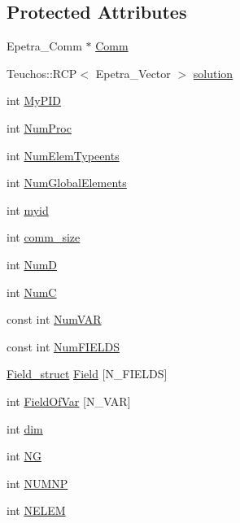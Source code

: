 \subsection*{Protected Attributes}
\begin{DoxyCompactItemize}
\item 
Epetra\+\_\+\+Comm $\ast$ \hyperlink{classGeProb_a28a1d41fc8c294fe629b95901df8f4e3}{Comm}
\item 
Teuchos\+::\+R\+CP$<$ Epetra\+\_\+\+Vector $>$ \hyperlink{classGeProb_af084ddda2d2d48a332141881d7b22a7d}{solution}
\item 
int \hyperlink{classGeProb_a646b814acd21db4a20bbbd9fe159da3f}{My\+P\+ID}
\item 
int \hyperlink{classGeProb_a8678d8a8dc17175ba98761beeccc0e04}{Num\+Proc}
\item 
int \hyperlink{classGeProb_a1555edf9114f6b65ef9a7820dfc16e63}{Num\+Elem\+Typeents}
\item 
int \hyperlink{classGeProb_af87232ea7d32eff7618f97a9792b3761}{Num\+Global\+Elements}
\item 
int \hyperlink{classGeProb_a45014741c0457991fb88b1dc1d2d31bc}{myid}
\item 
int \hyperlink{classGeProb_ab5aa970c9864597a442bfc8519352730}{comm\+\_\+size}
\item 
int \hyperlink{classGeProb_a1b63e3bc1b1f5e6582a87b044bbd4ccd}{NumD}
\item 
int \hyperlink{classGeProb_a579ca91b970ea46b1418310eaf5d8b31}{NumC}
\item 
const int \hyperlink{classGeProb_ac6d9c06150838e892ed3eaa1b60bac5d}{Num\+V\+AR}
\item 
const int \hyperlink{classGeProb_adede55ee31a140d1cd8a9076ecdc41e1}{Num\+F\+I\+E\+L\+DS}
\item 
\hyperlink{structField__struct}{Field\+\_\+struct} \hyperlink{classGeProb_aaaeb3e022301e2df5e180af7900a352e}{Field} \mbox{[}N\+\_\+\+F\+I\+E\+L\+DS\mbox{]}
\item 
int \hyperlink{classGeProb_a520a47a06c38cfe59938d2bbd65773a2}{Field\+Of\+Var} \mbox{[}N\+\_\+\+V\+AR\mbox{]}
\item 
int \hyperlink{classGeProb_a122f6dbb7e9a60a35f257ae369a57f77}{dim}
\item 
int \hyperlink{classGeProb_ac9a59a8c31ccad50b7eabc436c365391}{NG}
\item 
int \hyperlink{classGeProb_adf7ed4cdeae11b7e6f15acc0ca7c1d21}{N\+U\+M\+NP}
\item 
int \hyperlink{classGeProb_ac5a0f21b0737394d783b9ca32317ece8}{N\+E\+L\+EM}

\end{DoxyCompactItemize}
